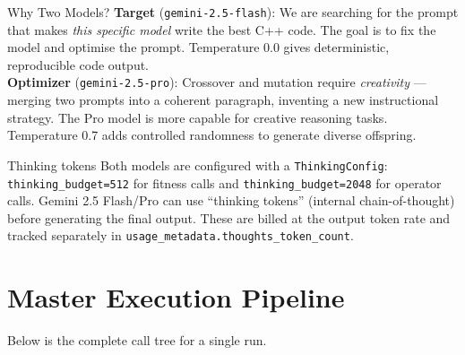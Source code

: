 \documentclass[11pt,a4paper]{report}
\newcommand{\fn}[1]{\texttt{#1}}
\begin{document}
\begin{conceptbox}{Why Two Models?}
\textbf{Target} (\texttt{gemini-2.5-flash}): We are searching for the prompt that makes
\emph{this specific model} write the best C++ code.  The goal is to fix the model and
optimise the prompt.  Temperature 0.0 gives deterministic, reproducible code output.\\[6pt]
\textbf{Optimizer} (\texttt{gemini-2.5-pro}): Crossover and mutation require
\emph{creativity} --- merging two prompts into a coherent paragraph, inventing a new
instructional strategy.  The Pro model is more capable for creative reasoning tasks.
Temperature 0.7 adds controlled randomness to generate diverse offspring.
\end{conceptbox}

\begin{conceptbox}{Thinking tokens}
Both models are configured with a \texttt{ThinkingConfig}: \texttt{thinking\_budget=512}
for fitness calls and \texttt{thinking\_budget=2048} for operator calls.  Gemini 2.5
Flash/Pro can use ``thinking tokens'' (internal chain-of-thought) before generating the
final output.  These are billed at the output token rate and tracked separately in
\fn{usage\_metadata.thoughts\_token\_count}.
\end{conceptbox}

\section{Master Execution Pipeline}

Below is the complete call tree for a single run.
\end{document}
